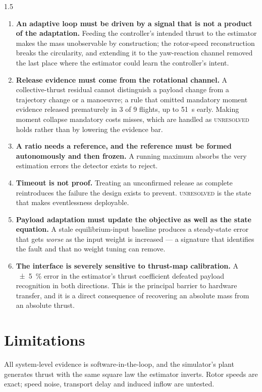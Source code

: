 \begin{spacing}{1.5}
\begin{enumerate}
\item \textbf{An adaptive loop must be driven by a signal that is not a product
of the adaptation.} Feeding the controller's intended thrust to the estimator
makes the mass unobservable by construction; the rotor-speed reconstruction
breaks the circularity, and extending it to the yaw-reaction channel removed the
last place where the estimator could learn the controller's intent.

\item \textbf{Release evidence must come from the rotational channel.} A
collective-thrust residual cannot distinguish a payload change from a trajectory
change or a manoeuvre; a rule that omitted mandatory moment evidence released
prematurely in 3 of 9 flights, up to \SI{51}{\second} early. Making moment
collapse mandatory costs misses, which are handled as \textsc{unresolved} holds
rather than by lowering the evidence bar.

\item \textbf{A ratio needs a reference, and the reference must be formed
autonomously and then frozen.} A running maximum absorbs the very estimation
errors the detector exists to reject.

\item \textbf{Timeout is not proof.} Treating an unconfirmed release as complete
reintroduces the failure the design exists to prevent. \textsc{unresolved} is the
state that makes eventlessness deployable.

\item \textbf{Payload adaptation must update the objective as well as the state
equation.} A stale equilibrium-input baseline produces a steady-state error that
gets \emph{worse} as the input weight is increased --- a signature that
identifies the fault and that no weight tuning can remove.

\item \textbf{The interface is severely sensitive to thrust-map calibration.} A
\SI{\pm5}{\percent} error in the estimator's thrust coefficient defeated payload
recognition in both directions. This is the principal barrier to hardware
transfer, and it is a direct consequence of recovering an absolute mass from an
absolute thrust.
\end{enumerate}

\section{Limitations}

All system-level evidence is software-in-the-loop, and the simulator's plant
generates thrust with the same square law the estimator inverts. Rotor speeds are
exact; speed noise, transport delay and induced inflow are untested.


\end{spacing}
